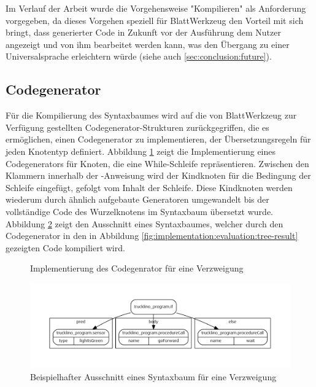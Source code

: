 Im Verlauf der Arbeit wurde die Vorgehensweise "Kompilieren" als Anforderung vorgegeben, da dieses Vorgehen speziell für BlattWerkzeug den Vorteil mit sich bringt, dass generierter Code in Zukunft vor der Ausführung dem Nutzer angezeigt und von ihm bearbeitet werden kann, was den Übergang zu einer Universalsprache erleichtern würde (siehe auch \ref{sec:conclusion:future}).

\subsection{Codegenerator}
\label{sec:implementation:evaluation:codegenerator}

Für die Kompilierung des Syntaxbaumes wird auf die von BlattWerkzeug zur Verfügung gestellten Codegenerator-Strukturen zurückgegriffen, die es ermöglichen, einen Codegenerator zu implementieren, der Übersetzungsregeln für jeden Knotentyp definiert. Abbildung \ref{fig:implementation:evaluation:codegenerator} zeigt die Implementierung eines Codegenerators für Knoten, die eine While-Schleife repräsentieren. Zwischen den Klammern innerhalb der -Anweisung wird der Kindknoten für die Bedingung der Schleife eingefügt, gefolgt vom Inhalt der Schleife. Diese Kindknoten werden wiederum durch ähnlich aufgebaute Generatoren umgewandelt bis der vollständige Code des Wurzelknotens im Syntaxbaum übersetzt wurde. Abbildung \ref{fig:implementation:evaluation:tree-render} zeigt den Ausschnitt eines Syntaxbaumes, welcher durch den Codegenerator in den in Abbildung \ref{fig:implementation:evaluation:tree-result} gezeigten Code kompiliert wird.

\begin{figure}
  
  \caption{Implementierung des Codegenrator für eine Verzweigung}
  \label{fig:implementation:evaluation:codegenerator}
\end{figure}

\begin{figure}
  \centering
  \includegraphics[width=\textwidth]{gfx/implementation-program-evaluation-tree.graphviz.pdf}
  \caption{Beispielhafter Ausschnitt eines Syntaxbaum für eine Verzweigung}
  \label{fig:implementation:evaluation:tree-render}
\end{figure}

